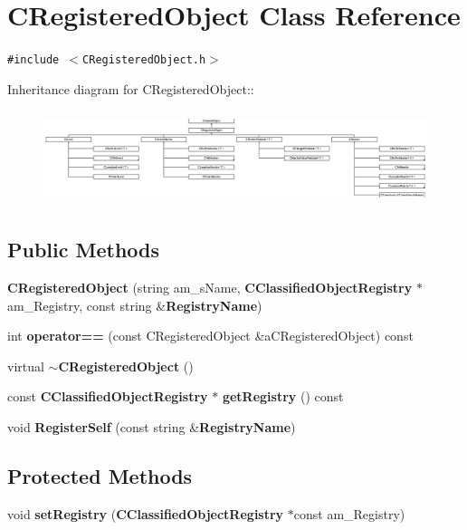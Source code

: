 \section{CRegistered\-Object  Class Reference}
\label{classCRegisteredObject}
{\tt \#include $<$CRegistered\-Object.h$>$}

Inheritance diagram for CRegistered\-Object::\begin{figure}[H]
\begin{center}
\leavevmode
\includegraphics[height=2.77533cm]{classCRegisteredObject}
\end{center}
\end{figure}
\subsection*{Public Methods}
\begin{CompactItemize}
\item 
{\bf CRegistered\-Object} (string am\_\-s\-Name, {\bf CClassified\-Object\-Registry} $\ast$am\_\-Registry, const string \&{\bf Registry\-Name})
\item 
int {\bf operator==} (const CRegistered\-Object \&a\-CRegistered\-Object) const
\item 
virtual {\bf $\sim$CRegistered\-Object} ()
\item 
const {\bf CClassified\-Object\-Registry} $\ast$ {\bf get\-Registry} () const
\item 
void {\bf Register\-Self} (const string \&{\bf Registry\-Name})
\end{CompactItemize}
\subsection*{Protected Methods}
\begin{CompactItemize}
\item 
void {\bf set\-Registry} ({\bf CClassified\-Object\-Registry} $\ast$const am\_\-Registry)
\end{CompactItemize}
